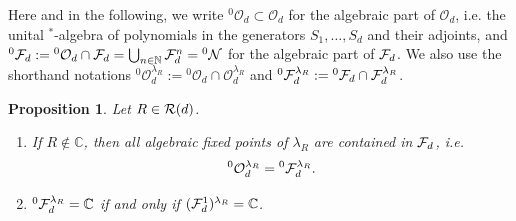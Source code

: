 \documentclass[12pt,a4paper]{amsart}
\numberwithin{equation}{section}
\newtheorem{proposition}[theorem]{Proposition}
\theoremstyle{remark}
\def\C{\mathbb{C}}
\def\N{\mathbb{N}}
\newcommand{\la}{\lambda}
\newcommand{\CO}[0]{\mathcal{O}} \newcommand{\CP}[0]{\mathcal{P}}
\begin{document}
Here and in the following, we write ${}^0\CO_d\subset\CO_d$ for the algebraic part of $\CO_d$, i.e. the unital ${}^*$-algebra of polynomials in the generators $S_1,\ldots,S_d$ and their adjoints, and ${}^0\CF_d:={}^0\CO_d\cap\CF_d=\bigcup_{n\in\N}\CF_d^n={}^0\CN$ for the algebraic part of $\mathcal{F}_d$. We also use the shorthand notations ${}^0\CO_d^{\la_R}:={}^0\CO_d\cap\CO_d^{\la_R}$ and ${}^0\CF_d^{\la_R}:={}^0\CF_d\cap\CF_d^{\la_R}$.


\begin{proposition}\label{prop:algebraicfixedpoints}
	Let $R\in\mathcal{R}(d)$.
	\begin{enumerate}
		\item\label{item:algebraicfixedpointsareinUHF} If $R\not\in\C$, then all algebraic fixed points of $\la_R$ are contained in $\mathcal{F}_d$, i.e.
		\begin{align}
			{}^0\CO_d^{\lambda_R}={}^0\CF_d^{\lambda_R}.
		\end{align}
		\item\label{item:fixedpointsinF1} ${}^0\CF_d^{\lambda_R}=\C$ if and only if $(\CF_d^1)^{\lambda_R}=\C$.
	\end{enumerate}
\end{proposition}
\end{document}
